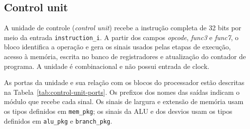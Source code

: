 \subsection{Control unit}
\label{sub:control_unit}

A unidade de controle (\textit{control unit}) recebe a instrução completa de 32 bits por meio da entrada \texttt{instruction\_i}. A partir dos campos \textit{opcode}, \textit{func3} e \textit{func7}, o bloco identifica a operação e gera os sinais usados pelas etapas de execução, acesso à memória, escrita no banco de registradores e atualização do contador de programa. A unidade é combinacional e não possui entrada de clock.


As portas da unidade e sua relação com os blocos do processador estão descritas na Tabela~\ref{tab:control-unit-ports}. Os prefixos dos nomes das saídas indicam o módulo que recebe cada sinal. Os sinais de largura e extensão de memória usam os tipos definidos em \texttt{mem\_pkg}; os sinais da ALU e dos desvios usam os tipos definidos em \texttt{alu\_pkg} e \texttt{branch\_pkg}.

